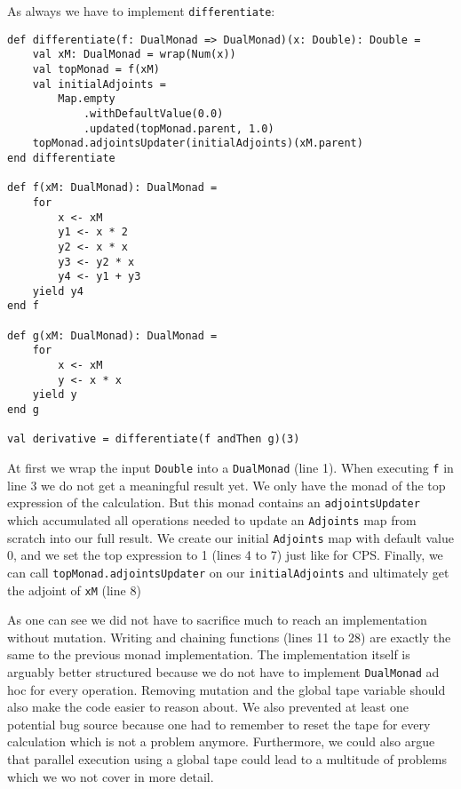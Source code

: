 As always we have to implement \lstinline{differentiate}:
\begin{lstlisting}
def differentiate(f: DualMonad => DualMonad)(x: Double): Double =
    val xM: DualMonad = wrap(Num(x))
    val topMonad = f(xM)
    val initialAdjoints =
        Map.empty
            .withDefaultValue(0.0)
            .updated(topMonad.parent, 1.0)
    topMonad.adjointsUpdater(initialAdjoints)(xM.parent)
end differentiate

def f(xM: DualMonad): DualMonad =
    for
        x <- xM
        y1 <- x * 2
        y2 <- x * x
        y3 <- y2 * x
        y4 <- y1 + y3
    yield y4
end f

def g(xM: DualMonad): DualMonad =
    for
        x <- xM
        y <- x * x
    yield y
end g

val derivative = differentiate(f andThen g)(3)
\end{lstlisting}
At first we wrap the input \lstinline{Double} into a \lstinline{DualMonad} (line 1). When executing \lstinline{f} in line 3 we do not get a meaningful result yet. We only have the monad of the top expression of the calculation. But this monad contains an \lstinline{adjointsUpdater} which accumulated all operations needed to update an \lstinline{Adjoints} map from scratch into our full result. We create our initial \lstinline{Adjoints} map with default value 0, and we set the top expression to 1 (lines 4 to 7) just like for CPS. Finally, we can call \lstinline{topMonad.adjointsUpdater} on our \lstinline{initialAdjoints} and ultimately get the adjoint of \lstinline{xM} (line 8)

As one can see we did not have to sacrifice much to reach an implementation without mutation. Writing and chaining functions (lines 11 to 28) are exactly the same to the previous monad implementation. The implementation itself is arguably better structured because we do not have to implement \lstinline{DualMonad} ad hoc for every operation. Removing mutation and the global tape variable should also make the code easier to reason about. We also prevented at least one potential bug source because one had to remember to reset the tape for every calculation which is not a problem anymore. Furthermore, we could also argue that parallel execution using a global tape could lead to a multitude of problems which we wo not cover in more detail.